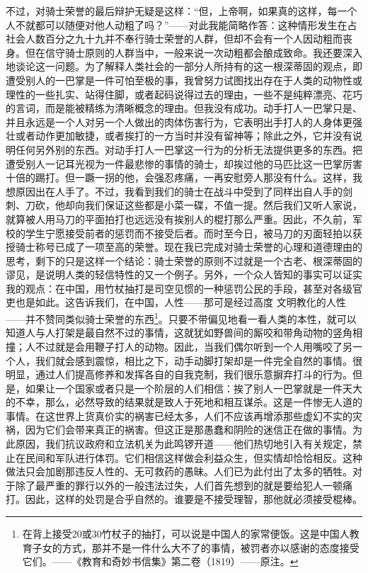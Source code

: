 \documentclass[12pt,oneside]{book}
\begin{document}
不过，对骑士荣誉的最后辩护无疑是这样：“但，上帝啊，如果真的这样，每一个人不就都可以随便对他人动粗了吗？”——对此我能简略作答：这种情形发生在占社会人数百分之九十九并不奉行骑士荣誉的人群，但却不会有一个人因动粗而丧身。但在信守骑士原则的人群当中，一般来说一次动粗都会酿成致命。我还要深入地谈论这一问题。为了解释人类社会的一部分人所持有的这一根深蒂固的观点，即遭受别人的一巴掌是一件可怕至极的事，我曾努力试图找出存在于人类的动物性或理性的一些扎实、站得住脚，或者起码说得过去的理由，一些不是纯粹漂亮、花巧的言词，而是能被精练为清晰概念的理由。但我没有成功。动手打人一巴掌只是、并且永远是一个人对另一个人做出的肉体伤害行为，它表明出手打人的人身体更强壮或者动作更加敏捷，或者挨打的一方当时并没有留神等；除此之外，它并没有说明任何另外别的东西。对动手打人一巴掌这一行为的分析无法提供更多的东西。把遭受别人一记耳光视为一件最悲惨的事情的骑士，却挨过他的马匹比这一巴掌厉害十倍的踢打。但一蹶一拐的他，会强忍疼痛，一再安慰旁人那没有什么。这样，我想原因出在人手了。不过，我看到我们的骑士在战斗中受到了同样出自人手的剑刺、刀砍，他却向我们保证这些都是小菜一碟，不值一提。然后我们又听人家说，就算被人用马刀的平面拍打也远远没有挨别人的棍打那么严重。因此，不久前，军校的学生宁愿接受前者的惩罚而不接受后者。而时至今日，被马刀的刃面轻拍以获授骑士称号已成了一项至高的荣誉。现在我已完成对骑士荣誉的心理和道德理由的思考，剩下的只是这样一个结论：骑士荣誉的原则不过就是一个古老、根深蒂固的谬见，是说明人类的轻信特性的又一个例子。另外，一个众人皆知的事实可以证实我的观点：在中国，用竹杖抽打是司空见惯的一种惩罚公民的手段，甚至对各级官吏也是如此。这告诉我们，在中国，人性——那可是经过高度
文明教化的人性——并不赞同类似骑士荣誉的东西\footnote{在背上接受20或30竹杖子的抽打，可以说是中国人的家常便饭。这是中国人教育子女的方式，那并不是一件什么大不了的事情，被罚者亦以感谢的态度接受它们。——《教育和奇妙书信集》第二卷（1819）——原注。}。只要不带偏见地看一看人类的本性，就可以知道人与人打架是最自然不过的事情，这就犹如野兽间的厮咬和带角动物的竖角相撞；人不过就是会用鞭子打人的动物。因此，当我们偶尔听到一个人用嘴咬了另一个人，我们就会感到震惊，相比之下，动手动脚打架却是一件完全自然的事情。很明显，通过人们提高修养和发挥各自的自我克制，我们很乐意摒弃打斗的行为。但是，如果让一个国家或者只是一个阶层的人们相信：挨了别人一巴掌就是一件天大的不幸，那么，必然导致的结果就是致人于死地和相互谋杀。这是一件惨无人道的事情。在这世界上货真价实的祸害已经太多，人们不应该再增添那些虚幻不实的灾祸，因为它们会带来真正的祸害。但这正是那愚蠢和阴险的迷信正在做的事情。为此原因，我们抗议政府和立法机关为此鸣锣开道——他们热切地引入有关规定，禁止在民间和军队进行体罚。它们相信这样做会利益众生，但实情却恰恰相反。这种做法只会加剧那违反人性的、无可救药的愚昧。人们已为此付出了太多的牺牲。对于除了最严重的罪行以外的一般违法过失，人们首先想到的就是要给犯人一顿痛打。因此，这样的处罚是合乎自然的。谁要是不接受理智，那他就必须接受棍棒。
\end{document}
